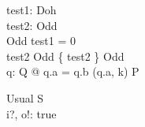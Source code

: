 \documentclass{article}
\begin{document}


\begin{axdef}
   test1: Doh \\
   test2: Odd \\
   \Delta Odd %
\where
   test1 = 0 
   \\
   test2 \in Odd \land \{ test2 \} \subseteq Odd
   \\
   \forall q: Q @ q.a = q.b \land (q.a, k) \in P   
\end{axdef}

\begin{schema}{Usual}
   \Delta S \\
   i?, o!: \nat
\where
    true
\end{schema}
\end{document}
